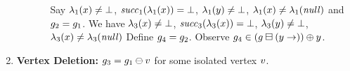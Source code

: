 \begin{enumerate}
\begin{enumerate}
\begin{itemize}
    Say
    $\lambda_1(x)\neq\bot$, %
    ${\it succ}_1(\lambda_1(x))=\bot$, %
    $\lambda_1(y)\neq\bot$, %
    $\lambda_1(x)\neq\lambda_1({\it null})$ %
    and %
    $g_2=g_1$.
    We have 
   $\lambda_3(x)\neq\bot$, %
    ${\it succ}_3(\lambda_3(x))=\bot$, %
    $\lambda_3(y)\neq\bot$, %
    $\lambda_3(x)\neq\lambda_3({\it null})$ %
    Define $g_4=g_2$. 
    Observe $g_4\in(g\boxminus({y}\rightarrow))\oplus{\ensuremath{y}}$.
  \end{itemize}
\end{enumerate}
\item {\bf Vertex Deletion:}
$g_3=g_1\ominus{\ensuremath{v}}$ for
some isolated vertex $v$.


\end{enumerate}
